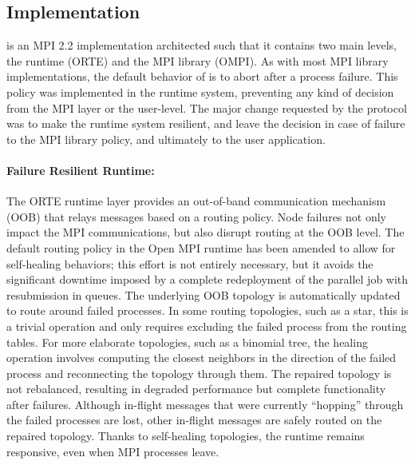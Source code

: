 \subsection{\ompi Implementation\label{sec:mpi}}

\ompi is an MPI 2.2 implementation architected such that it contains two
main levels, the runtime (ORTE) and the MPI library (OMPI). As with most
MPI library implementations, the default behavior of \ompi is to abort
after a process failure. This policy was implemented in the runtime
system, preventing any kind of decision from the MPI layer or the
user-level. The major change requested by the \cof protocol was to make the
runtime system resilient, and leave the decision in case of failure to
the MPI library policy, and ultimately to the user application.

\paragraph*{Failure Resilient Runtime:} The ORTE runtime layer provides
an out-of-band communication mechanism (OOB) that relays messages based
on a routing policy. Node failures not only impact the MPI
communications, but also disrupt routing at the OOB level. The
default routing policy in the Open MPI runtime has been amended to allow
for self-healing behaviors; this effort is not entirely 
necessary, but it avoids the significant downtime imposed by a complete 
redeployment of the parallel job with resubmission in queues. The 
underlying OOB topology is automatically updated to route around failed processes. In some routing topologies,
such as a star, this is a trivial operation and only requires excluding
the failed process from the routing tables. For more elaborate
topologies, such as a binomial tree, the healing operation involves
computing the closest neighbors in the direction of the failed process
and reconnecting the topology through them. The repaired topology is
not rebalanced, resulting in degraded performance but complete
functionality after failures. Although in-flight messages that were
currently ``hopping'' through the failed processes are lost, other
in-flight messages are safely routed on the repaired topology. Thanks to self-healing topologies, the runtime remains responsive, even when MPI processes leave. 

